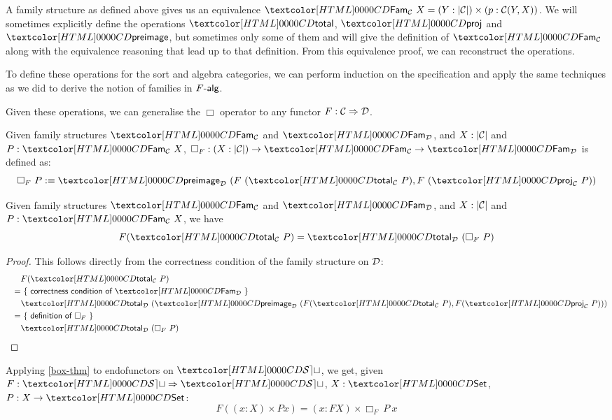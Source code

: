 A family structure as defined above gives us an equivalence
$\Fam_{\Cc}\ X = (Y : | \Cc |) \times (p : \Cc(Y,X))$. We will
sometimes explicitly define the operations $\total$, $\proj$ and
$\preimage$, but sometimes only some of them and will give the
definition of $\Fam_{\Cc}$ along with the equivalence reasoning that
lead up to that definition. From this equivalence proof, we can
reconstruct the operations.

To define these operations for the sort and algebra categories, we can
perform induction on the specification and apply the same techniques
as we did to derive the notion of families in $\algcat{F}$.

Given these operations, we can generalise the $\Box$ operator to any
functor $F : \mathcal{C} \Rightarrow \mathcal{D}$.

\begin{definition}
  Given family structures $\Fam_{\Cc}$ and $\Fam_{\Dd}$, and
  $X : | \mathcal{C} |$ and $P : \Fam_{\Cc}\ X$,
  $\Box_F : (X : | \Cc |) \to \Fam_{\Cc} \to \Fam_{\Dd}$ is defined
  as:
  $$
  \Box_F\ P \ddefeq \preimage_{\Dd}\ (F\ (\total_{\Cc}\ P) ,
  F\ (\proj_{\Cc}\ P))
  $$
\end{definition}

\begin{proposition}
  \label{box-thm}
  Given family structures $\Fam_{\Cc}$ and $\Fam_{\Dd}$, and
  $X : | \mathcal{C} |$ and $P : \Fam_{\Cc}\ X$, we have
  $$
  F (\total_{\Cc}\ P) = \total_{\Dd}\ (\Box_F\ P)
  $$
\end{proposition}

\begin{proof}
  This follows directly from the correctness condition of the family
  structure on $\mathcal{D}$:
  \begin{align*}
    &&&F (\total_{\Cc}\ P) \\
    &&=&\ \reasontext{correctness condition of $\Fam_{\Dd}$} \\
    &&&\total_{\Dd}\ (\preimage_{\Dd}\ (F (\total_{\Cc}\ P), F (\proj_{\Cc}\ P))) \\
    &&=&\ \reasontext{definition of $\Box_F$} \\
    &&&\total_{\Dd}\ (\Box_F\ P)
  \end{align*}
\end{proof}

\begin{corollary}
  Applying \cref{box-thm} to endofunctors on $\SET$, we get, given
  $F : \Func{\SET}{\SET}$, $X : \Set$, $P : X \to \Set$:
  $$
  F ((x : X) \times P x) = (x : FX) \times \Box_F\ P\ x
  $$
\end{corollary}

